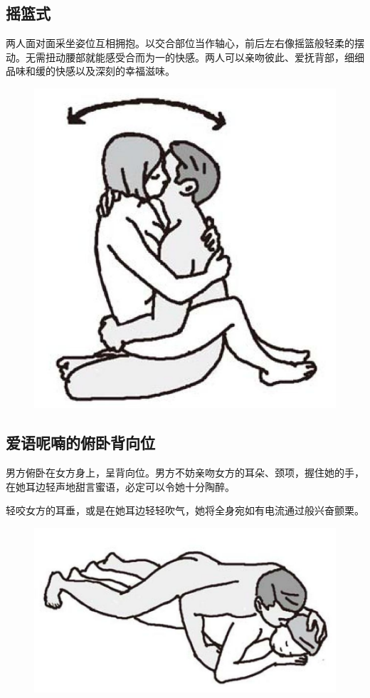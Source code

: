 \documentclass[12pt,UTF8]{ctexbook}
\begin{document}
\subsection{摇篮式}

两人面对面采坐姿位互相拥抱。以交合部位当作轴心，前后左右像摇篮般轻柔的摆动。无需扭动腰部就能感受合而为一的快感。两人可以亲吻彼此、爱抚背部，细细品味和缓的快感以及深刻的幸福滋味。

\begin{figure}[htbp]
	\centering
	\includegraphics[width=0.7\linewidth]{tw15}
	\caption{}
	\label{fig:1}
\end{figure}

\subsection{爱语呢喃的俯卧背向位}

男方俯卧在女方身上，呈背向位。男方不妨亲吻女方的耳朵、颈项，握住她的手，在她耳边轻声地甜言蜜语，必定可以令她十分陶醉。

轻咬女方的耳垂，或是在她耳边轻轻吹气，她将全身宛如有电流通过般兴奋颤栗。

\begin{figure}[htbp]
	\centering
	\includegraphics[width=0.7\linewidth]{tw16}
	\caption{}
	\label{fig:1}
\end{figure}
\end{document}
